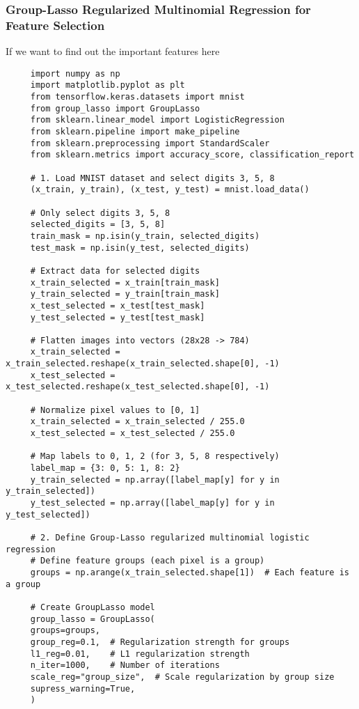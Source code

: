 \documentclass[letterpaper]{article}
\begin{document}
\subsubsection{Group-Lasso Regularized Multinomial Regression for Feature Selection}

If we want to find out the important features here
\begin{lstlisting}
     import numpy as np
     import matplotlib.pyplot as plt
     from tensorflow.keras.datasets import mnist
     from group_lasso import GroupLasso
     from sklearn.linear_model import LogisticRegression
     from sklearn.pipeline import make_pipeline
     from sklearn.preprocessing import StandardScaler
     from sklearn.metrics import accuracy_score, classification_report
     
     # 1. Load MNIST dataset and select digits 3, 5, 8
     (x_train, y_train), (x_test, y_test) = mnist.load_data()
     
     # Only select digits 3, 5, 8
     selected_digits = [3, 5, 8]
     train_mask = np.isin(y_train, selected_digits)
     test_mask = np.isin(y_test, selected_digits)
     
     # Extract data for selected digits
     x_train_selected = x_train[train_mask]
     y_train_selected = y_train[train_mask]
     x_test_selected = x_test[test_mask]
     y_test_selected = y_test[test_mask]
     
     # Flatten images into vectors (28x28 -> 784)
     x_train_selected = x_train_selected.reshape(x_train_selected.shape[0], -1)
     x_test_selected = x_test_selected.reshape(x_test_selected.shape[0], -1)
     
     # Normalize pixel values to [0, 1]
     x_train_selected = x_train_selected / 255.0
     x_test_selected = x_test_selected / 255.0
     
     # Map labels to 0, 1, 2 (for 3, 5, 8 respectively)
     label_map = {3: 0, 5: 1, 8: 2}
     y_train_selected = np.array([label_map[y] for y in y_train_selected])
     y_test_selected = np.array([label_map[y] for y in y_test_selected])
     
     # 2. Define Group-Lasso regularized multinomial logistic regression
     # Define feature groups (each pixel is a group)
     groups = np.arange(x_train_selected.shape[1])  # Each feature is a group
     
     # Create GroupLasso model
     group_lasso = GroupLasso(
     groups=groups,
     group_reg=0.1,  # Regularization strength for groups
     l1_reg=0.01,    # L1 regularization strength
     n_iter=1000,    # Number of iterations
     scale_reg="group_size",  # Scale regularization by group size
     supress_warning=True,
     )
     

\end{lstlisting}
\end{document}
